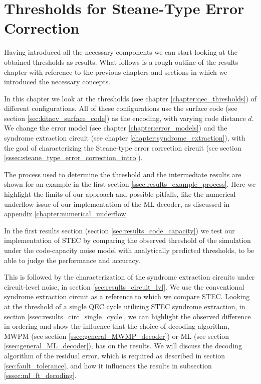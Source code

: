 \chapter{Thresholds for Steane-Type Error Correction}\label{chapter:results}


Having introduced all the necessary components we can start looking at the obtained thresholds as results.
What follows is a rough outline of the results chapter with reference to the previous chapters and sections in which we introduced the necessary concepts.

In this chapter we look at the thresholds (see chapter \ref{chapter:qec_thresholds}) of different configurations.
All of these configurations use the surface code (see section \ref{sec:kitaev_surface_code}) as the encoding, with varying code distance $d$.
We change the error model (see chapter \ref{chapter:error_models}) and the syndrome extraction circuit (see chapter \ref{chapter:syndrome_extraction}),
with the goal of characterizing the Steane-type error correction circuit (see section \ref{sssec:steane_type_error_correction_intro}). 

The process used to determine the threshold and the intermediate results are shown for an example in the first section \ref{ssec:results_example_process}.
Here we highlight the limits of our approach and possible pitfalls, like the numerical underflow issue of our implementation of the ML decoder, as discussed in appendix \ref{chapter:numerical_underflow}. 

In the first results section (section \ref{sec:results_code_capacity}) we test our implementation of STEC by comparing the observed threshold of the simulation under the code-capacity noise model 
with analytically predicted thresholds, to be able to judge the performance and accuracy.

This is followed by the characterization of the syndrome extraction circuits under circuit-level noise, in section \ref{sec:results_circuit_lvl}.
We use the conventional syndrome extraction circuit as a reference to which we compare STEC.
Looking at the threshold of a single QEC cycle utilizing STEC syndrome extraction, in section \ref{ssec:results_circ_single_cycle}, 
we can highlight the observed difference in ordering and show the influence that the choice of decoding algorithm, MWPM (see section \ref{ssec:general_MWMP_decoder}) or ML (see section \ref{ssec:general_ML_decoder}), has on the results. 
We will discuss the decoding algorithm of the residual error, which is required as described in section \ref{sec:fault_tolerance}, and how it influences the results in subsection \ref{sssec:ml_ft_decoding}.

